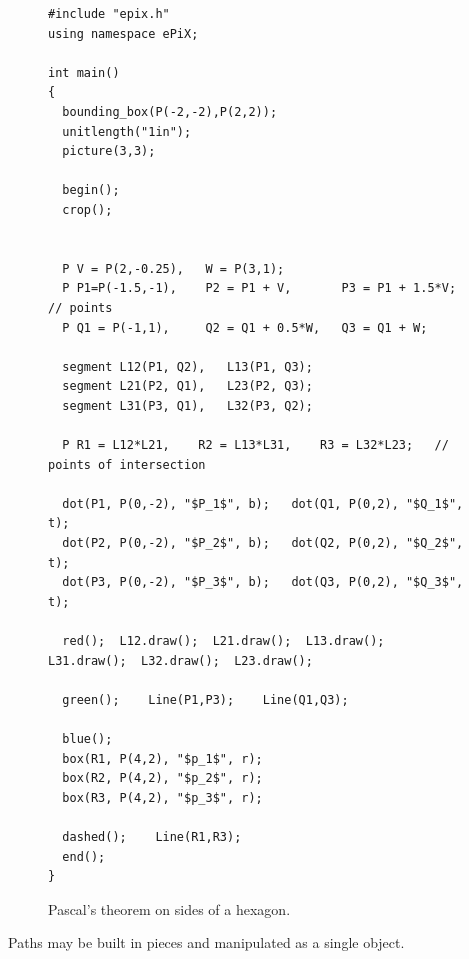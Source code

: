 \documentclass[11pt]{article}
\begin{document}
\begin{figure}[hbt]
\begin{center}

\vspace*{-2.5in}
\begin{footnotesize}
\begin{verbatim}
#include "epix.h"
using namespace ePiX;

int main() 
{
  bounding_box(P(-2,-2),P(2,2));
  unitlength("1in");
  picture(3,3);

  begin(); 
  crop();


  P V = P(2,-0.25),   W = P(3,1);
  P P1=P(-1.5,-1),    P2 = P1 + V,       P3 = P1 + 1.5*V;    // points
  P Q1 = P(-1,1),     Q2 = Q1 + 0.5*W,   Q3 = Q1 + W;

  segment L12(P1, Q2),   L13(P1, Q3);
  segment L21(P2, Q1),   L23(P2, Q3);
  segment L31(P3, Q1),   L32(P3, Q2);

  P R1 = L12*L21,    R2 = L13*L31,    R3 = L32*L23;   // points of intersection

  dot(P1, P(0,-2), "$P_1$", b);   dot(Q1, P(0,2), "$Q_1$", t); 
  dot(P2, P(0,-2), "$P_2$", b);   dot(Q2, P(0,2), "$Q_2$", t);
  dot(P3, P(0,-2), "$P_3$", b);   dot(Q3, P(0,2), "$Q_3$", t);   

  red();  L12.draw();  L21.draw();  L13.draw();  L31.draw();  L32.draw();  L23.draw();

  green();    Line(P1,P3);    Line(Q1,Q3);

  blue();
  box(R1, P(4,2), "$p_1$", r);
  box(R2, P(4,2), "$p_2$", r);
  box(R3, P(4,2), "$p_3$", r);

  dashed();    Line(R1,R3);
  end();
}
\end{verbatim}
\end{footnotesize}
\caption{Pascal's theorem on sides of a hexagon.}
\label{fig:pascal}
\end{center}
\end{figure}

\clearpage

\noindent Paths may be built in pieces and manipulated as a single object.
\end{document}
